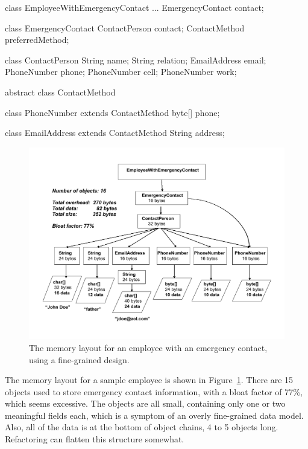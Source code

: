 \begin{shortlisting} 
class EmployeeWithEmergencyContact {
    ...
    EmergencyContact contact;
}
			
class EmergencyContact {
    ContactPerson contact;
    ContactMethod preferredMethod;
}
			
class ContactPerson {
    String name;
    String relation;
    EmailAddress email;
    PhoneNumber phone;
    PhoneNumber cell;
    PhoneNumber work;
}
			
abstract class ContactMethod {
}
			
class PhoneNumber extends ContactMethod {
    byte[] phone;
}
			
class EmailAddress extends ContactMethod {
    String address;
}
\end{shortlisting}
 \begin{figure}
  \centering
 \includegraphics[width=\textwidth]{part1/Figures/modelingdatatypes/employee-status-fine-grained.pdf}
  \caption{The memory layout for an employee with an emergency contact, using
  a fine-grained design.}
  \label{fig:employee-status-fine-grained}
\end{figure}
The memory layout for a sample employee is shown in Figure~\ref{fig:employee-status-fine-grained}. There
are 15 objects used to store emergency contact information, with a bloat factor of 77\%, which seems excessive.
The objects are all small, containing only one or two meaningful fields each,
which is a symptom of an overly fine-grained
data model. Also, all of the data is at the bottom of object chains, 4 to 5 objects long. Refactoring
can flatten this structure somewhat.

